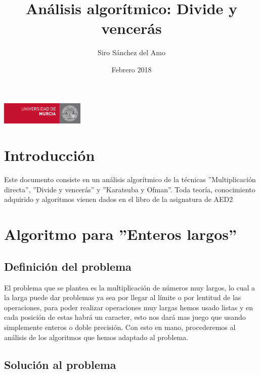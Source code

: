 \documentclass{article}
\title{Análisis algorítmico: Divide y vencerás}
\author{Siro Sánchez del Amo}
\date{Febrero 2018}
\begin{document}
\maketitle
\vfill 
   {\begin{flushright}
   \includegraphics[width=4cm]{umulogo.jpg}
   \end{flushright}}

\thispagestyle{empty}
\newpage

\tableofcontents
\thispagestyle{fancy}
\newpage

\section{Introducción}
Este documento consiste en un análisis algorítmico de la técnicas ''Multiplicación directa'', ''Divide y vencerás'' y ''Karatsuba y Ofman''. Toda teoría, conocimiento adquirido y algoritmos vienen dados en el libro de la asignatura de AED2 \cite{AED2}

\section{Algoritmo para ''Enteros largos''}
\subsection{Definición del problema}
El problema que se plantea es la multiplicación de números muy largos, lo cual a la larga puede dar problemas ya sea por llegar al límite o por lentitud de las operaciones, para poder realizar operaciones muy largas hemos usado listas y en cada posición de estas habrá un caracter, esto nos dará mas juego que usando simplemente enteros o doble precisión. Con esto en mano, procederemos al análisis de los algoritmos que hemos adaptado al problema.

\subsection{Solución al problema}
\end{document}
